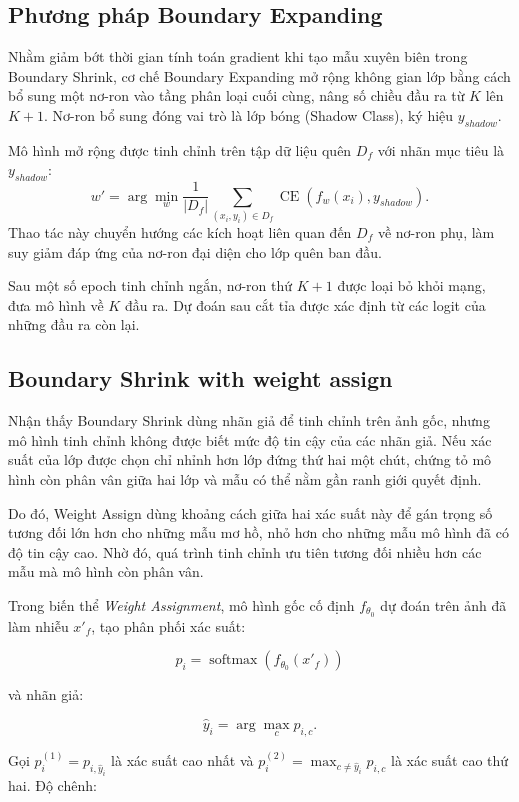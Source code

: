 \documentclass[conference]{IEEEtran}
\newcommand{\CE}{\operatorname{CE}}
\begin{document}
\subsection{Phương pháp Boundary Expanding}
Nhằm giảm bớt thời gian tính toán gradient khi tạo mẫu xuyên biên trong Boundary Shrink, cơ chế Boundary Expanding mở rộng không gian lớp bằng cách bổ sung một nơ-ron vào tầng phân loại cuối cùng, nâng số chiều đầu ra từ $K$ lên $K+1$. Nơ-ron bổ sung đóng vai trò là lớp bóng (Shadow Class), ký hiệu $y_{shadow}$.

Mô hình mở rộng được tinh chỉnh trên tập dữ liệu quên $D_f$ với nhãn mục tiêu là $y_{shadow}$:
\begin{equation}
w'=\arg\min_w\frac{1}{|D_f|}\sum_{(x_i,y_i)\in D_f}\CE(f_w(x_i),y_{shadow}).
\end{equation}
Thao tác này chuyển hướng các kích hoạt liên quan đến $D_f$ về nơ-ron phụ, làm suy giảm đáp ứng của nơ-ron đại diện cho lớp quên ban đầu.

Sau một số epoch tinh chỉnh ngắn, nơ-ron thứ $K+1$ được loại bỏ khỏi mạng, đưa mô hình về $K$ đầu ra. Dự đoán sau cắt tỉa được xác định từ các logit của những đầu ra còn lại.


\subsection{Boundary Shrink with weight assign}

Nhận thấy Boundary Shrink dùng nhãn giả để tinh chỉnh trên ảnh gốc, nhưng mô hình tinh chỉnh không được biết mức độ tin cậy của các nhãn giả. Nếu xác suất của lớp được chọn chỉ nhỉnh hơn lớp đứng thứ hai một chút, chứng tỏ mô hình còn phân vân giữa hai lớp và mẫu có thể nằm gần ranh giới quyết định.

Do đó, Weight Assign dùng khoảng cách giữa hai xác suất này để gán trọng số tương đối lớn hơn cho những mẫu mơ hồ, nhỏ hơn cho những mẫu mô hình đã có độ tin cậy cao. Nhờ đó, quá trình tinh chỉnh ưu tiên tương đối nhiều hơn các mẫu mà mô hình còn phân vân.

Trong biến thể \textit{Weight Assignment}, mô hình gốc cố định \(f_{\theta_0}\) dự đoán trên ảnh đã làm nhiễu \(x'_f\), tạo phân phối xác suất:

\[
p_i = \operatorname{softmax}(f_{\theta_0}(x'_f))
\]

và nhãn giả:

\[
\hat{y}_i = \arg\max_c p_{i,c}.
\]

Gọi \(p_i^{(1)} = p_{i,\hat{y}_i}\) là xác suất cao nhất và \(p_i^{(2)} = \max_{c\ne\hat{y}_i}p_{i,c}\) là xác suất cao thứ hai. Độ chênh:
\end{document}
